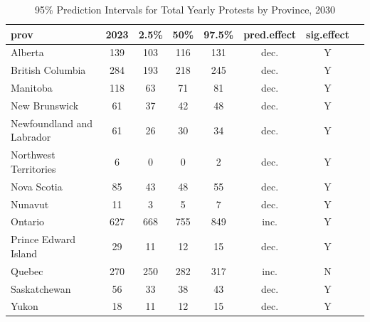 \documentclass[12pt]{article}
\begin{document}
\begin{table}[hbt!]
  \centering
  \begin{tabular}{|l|c|c|c|c|c|c|c|}
    \hline
    \textbf{prov}             & \textbf{2023} & \textbf{2.5\%} & \textbf{50\%} & \textbf{97.5\%} & \textbf{pred.effect} & \textbf{sig.effect} \\

    \hline
    Alberta                   & 139           & 103            & 116           & 131             & dec.                 & Y                   \\
    British Columbia          & 284           & 193            & 218           & 245             & dec.                 & Y                   \\
    Manitoba                  & 118           & 63             & 71            & 81              & dec.                 & Y                   \\
    New Brunswick             & 61            & 37             & 42            & 48              & dec.                 & Y                   \\
    Newfoundland and Labrador & 61            & 26             & 30            & 34              & dec.                 & Y                   \\
    Northwest Territories     & 6             & 0              & 0             & 2               & dec.                 & Y                   \\
    Nova Scotia               & 85            & 43             & 48            & 55              & dec.                 & Y                   \\
    Nunavut                   & 11            & 3              & 5             & 7               & dec.                 & Y                   \\
    Ontario                   & 627           & 668            & 755           & 849             & inc.                 & Y                   \\
    Prince Edward Island      & 29            & 11             & 12            & 15              & dec.                 & Y                   \\
    Quebec                    & 270           & 250            & 282           & 317             & inc.                 & N                   \\
    Saskatchewan              & 56            & 33             & 38            & 43              & dec.                 & Y                   \\
    Yukon                     & 18            & 11             & 12            & 15              & dec.                 & Y                   \\
    \hline
  \end{tabular}
  \caption{95\% Prediction Intervals for Total Yearly Protests by Province, 2030}
\end{table}
\end{document}
